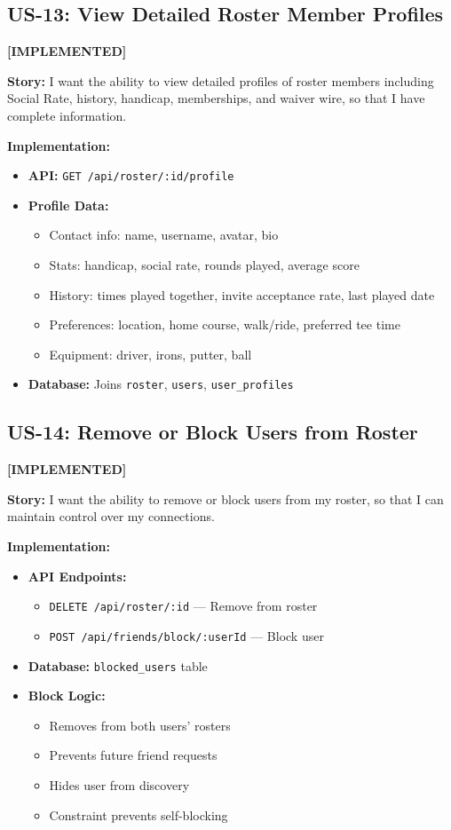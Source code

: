 \documentclass[11pt,a4paper]{article}
\newcommand{\implemented}{\textcolor{implemented}{\textbf{[IMPLEMENTED]}}}
\begin{document}
\subsection{US-13: View Detailed Roster Member Profiles}
\implemented

\textbf{Story:} I want the ability to view detailed profiles of roster members including Social Rate, history, handicap, memberships, and waiver wire, so that I have complete information.

\textbf{Implementation:}
\begin{itemize}[leftmargin=*]
  \item \textbf{API:} \texttt{GET /api/roster/:id/profile}
  \item \textbf{Profile Data:}
    \begin{itemize}
      \item Contact info: name, username, avatar, bio
      \item Stats: handicap, social rate, rounds played, average score
      \item History: times played together, invite acceptance rate, last played date
      \item Preferences: location, home course, walk/ride, preferred tee time
      \item Equipment: driver, irons, putter, ball
    \end{itemize}
  \item \textbf{Database:} Joins \texttt{roster}, \texttt{users}, \texttt{user\_profiles}
\end{itemize}

\subsection{US-14: Remove or Block Users from Roster}
\implemented

\textbf{Story:} I want the ability to remove or block users from my roster, so that I can maintain control over my connections.

\textbf{Implementation:}
\begin{itemize}[leftmargin=*]
  \item \textbf{API Endpoints:}
    \begin{itemize}
      \item \texttt{DELETE /api/roster/:id} --- Remove from roster
      \item \texttt{POST /api/friends/block/:userId} --- Block user
    \end{itemize}
  \item \textbf{Database:} \texttt{blocked\_users} table
  \item \textbf{Block Logic:}
    \begin{itemize}
      \item Removes from both users' rosters
      \item Prevents future friend requests
      \item Hides user from discovery
      \item Constraint prevents self-blocking
    \end{itemize}
\end{itemize}
\end{document}
